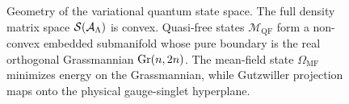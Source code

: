 \begin{figure}[htbp]
\caption{Geometry of the variational quantum state space. The full density matrix space $\mathcal{S}(\mathcal{A}_{\Lambda})$ is convex. Quasi-free states $\mathcal{M}_{\mathrm{QF}}$ form a non-convex embedded submanifold whose pure boundary is the real orthogonal Grassmannian $\operatorname{Gr}(n, 2n)$. The mean-field state $\Omega_{\mathrm{MF}}$ minimizes energy on the Grassmannian, while Gutzwiller projection maps onto the physical gauge-singlet hyperplane.}
\label{fig:m1_1b_grassmannian_schematic}
\end{figure}
